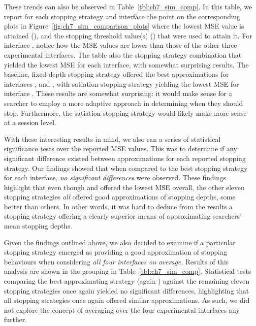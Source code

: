 These trends can also be observed in Table~\ref{tbl:ch7_sim_comp}. In this table, we report for each stopping strategy and interface the point on the corresponding plots in Figure~\ref{fig:ch7_sim_comparison_plots} where the lowest MSE value is attained (), and the stopping threshold value(s) () that were used to attain it. For interface , notice how the MSE values are lower than those of the other three experimental interfaces. The table also  the stopping strategy combination that yielded the lowest MSE for each interface, with somewhat surprising results. The baseline, fixed-depth stopping strategy  offered the best approximations for interfaces ,  and , with satiation stopping strategy  yielding the lowest MSE for interface . These results are somewhat surprising: it would make sense for a searcher to employ a more adaptive approach in determining when they should stop. Furthermore, the satiation stopping strategy would likely make more sense at a session level.


With these interesting results in mind, we also ran a series of statistical significance tests over the reported MSE values. This was to determine if any significant difference existed between approximations for each reported stopping strategy. Our findings showed that when compared to the best stopping strategy for each interface, \emph{no significant differences} were observed. These findings highlight that even though  and  offered the lowest MSE overall, the other eleven stopping strategies \emph{all} offered good approximations of stopping depths, some better than others. In other words, it was hard to deduce from the results a stopping strategy offering a clearly superior means of approximating searchers' mean stopping depths.

Given the findings outlined above, we also decided to examine if a particular stopping strategy emerged as providing a good approximation of stopping behaviours when considering \emph{all four interfaces on average.} Results of this analysis are shown in the  grouping in Table~\ref{tbl:ch7_sim_comp}. Statistical tests comparing the best approximating strategy (again ) against the remaining eleven stopping strategies once again yielded no significant differences, highlighting that all stopping strategies once again offered similar approximations. As such, we did not explore the concept of averaging over the four experimental interfaces any further.

